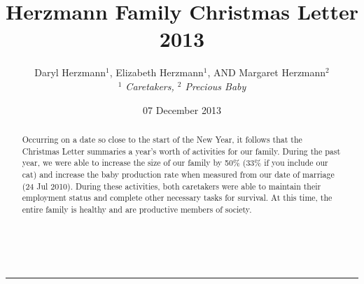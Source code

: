 \documentclass{article}
\title{Herzmann Family Christmas Letter 2013}
\author{Daryl Herzmann${}^1$, Elizabeth Herzmann${}^1$, AND Margaret Herzmann${}^2$ \\
\it{${}^1$ Caretakers},
\it{${}^2$ Precious Baby}}
\date{07 December 2013}
\newcommand{\Line}[0]{%
  \rule{0cm}{0cm}\\\hrule\rule{0cm}{0cm}%
}
\begin{document}
\maketitle

\begin{abstract}
Occurring on a date so close to the start of the New Year, it follows that
the Christmas Letter summaries a year's worth of activities for our family.
During the past year, we were able to increase the size of our family by
50\% (33\% if you include our cat) and increase the baby production rate
when measured from our date of marriage (24 Jul 2010).  During these activities, both
caretakers were able to maintain their employment status and complete other
necessary tasks for survival.  At this time, the entire family is healthy
and are productive members of society.

\end{abstract}

\Line
\end{document}
